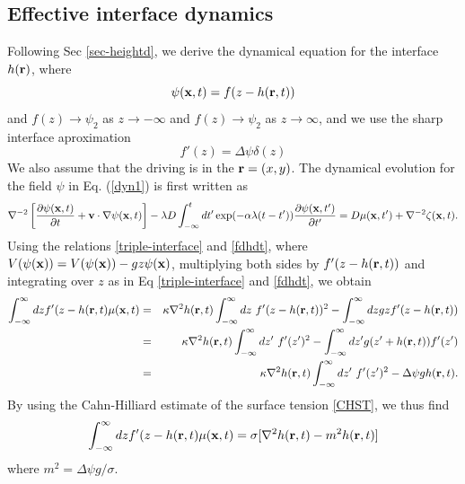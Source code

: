 \subsection{Effective interface dynamics}

Following Sec \ref{sec-heightd}, we derive the dynamical equation for the interface $h({\bf r})$, where
\begin{equation}
    \psi({\bf x},t) = f(z-h({\bf r},t))
    \label{dynamical-interface}
\end{equation}
and $f(z)\to \psi_2$ as $z\to -\infty$ and $f(z)\to \psi_2$ as  $z\to \infty$, and we use the sharp interface aproximation
\begin{equation}
    f'(z)=\Delta\psi \delta(z)
    \label{eqdelta}
\end{equation}
We also assume that the driving is in the ${\bf r}=(x,y)$. The dynamical evolution for the field $\psi$ in Eq. (\ref{dyn1}) is first written as
\begin{equation}
\nabla^{-2}\left[\frac{\partial \psi({\bf x},t)}{\partial t}+{\bf v}\cdot\nabla\psi({\bf x}, t)\right] -\lambda D\int_{-\infty}^t dt'
\exp(-\alpha\lambda(t-t')) \frac{\partial \psi({\bf x},t')}{\partial t'}=D  \mu({\bf x},t') + \nabla^{-2} \zeta({\bf x},t).\label{eqpsi}
\end{equation}
Using the relations \eqref{triple-interface} and \eqref{fdhdt}, where $V(\psi({\bf x})) = V(\psi({\bf x}))-gz \psi({\bf x})$, multiplying both sides by  $f'(z-h({\bf r},t))$ and integrating over $z$ as in Eq \eqref{triple-interface} and \eqref{fdhdt}, we obtain
\begin{eqnarray}
\int_{-\infty}^\infty dz f'(z-h({\bf r},t)\mu(\bx,t)&=& \kappa \nabla^2 h({\bf r},t)\int_{-\infty}^\infty dz\ f'(z-h({\bf r},t))^2 - \int_{-\infty}^\infty dz gz f'(z-h({\bf r},t))\nonumber \\&=&
\kappa\nabla^2 h({\bf r},t)\int_{-\infty}^\infty dz'\ f'(z')^2 - \int_{-\infty}^\infty dz' g(z' +h({\bf r},t)) f'(z')\nonumber \\
&=& \kappa\nabla^2 h({\bf r},t)\int_{-\infty}^\infty dz' \ f'(z')^2 -\Delta\psi g h({\bf r},t).
\end{eqnarray}
By using the Cahn-Hilliard estimate of the surface tension \eqref{CHST}, we thus find
\begin{equation}
    \int_{-\infty}^\infty dz f'(z-h({\bf r},t)\mu({\bf x},t) = \sigma[\nabla^2 h({\bf r},t)-m^2 h({\bf r},t)]
\end{equation}
where $m^2 = \Delta\psi g /\sigma$. 


